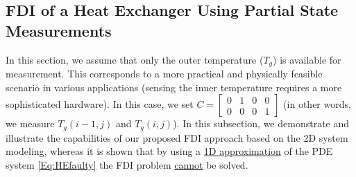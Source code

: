 \documentclass[journal,12pt,draftcls,onecolumn]{IEEEtran}
\newcommand{\bbm}{\begin{bmatrix}}
\newcommand{\ebm}{\end{bmatrix}}
\begin{document}
\subsection{FDI of a Heat Exchanger Using Partial State Measurements}
In this section, we assume that only the outer temperature ($T_g$) is available for measurement. This corresponds to a more practical and physically feasible scenario in various applications (sensing the inner temperature requires a more sophisticated hardware). In this case, we set $C = \bbm 0 &1 &0 &0\\0 &0 &0 &1\ebm$ (in other words, we measure $T_g(i-1,j)$ and $T_g(i,j)$). In this subsection, we demonstrate and illustrate the capabilities of our proposed FDI approach based on the 2D system modeling, whereas it is shown that by using a \underline{1D approximation} of the PDE system \eqref{Eq:HEfaulty} the FDI problem \underline{cannot} be solved.
\end{document}
